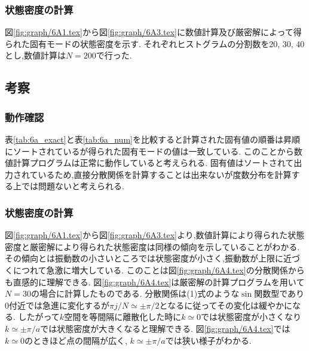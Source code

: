 \subsubsection{状態密度の計算}
図\ref{fig:graph/6A1.tex}から図\ref{fig:graph/6A3.tex}に数値計算及び厳密解によって得られた固有モードの状態密度を示す.
それぞれヒストグラムの分割数を20, 30, 40とし,数値計算は$N=200$で行った.
\subsection{考察}
\subsubsection{動作確認}
表\ref{tab:6a_exact}と表\ref{tab:6a_num}を比較すると計算された固有値の順番は昇順にソートされているが得られた固有モードの値は一致している.
このことから数値計算プログラムは正常に動作していると考えられる.
固有値はソートされて出力されているため,直接分散関係を計算することは出来ないが度数分布を計算する上では問題ないと考えられる.
\subsubsection{状態密度の計算}
図\ref{fig:graph/6A1.tex}から図\ref{fig:graph/6A3.tex}より,数値計算により得られた状態密度と厳密解により得られた状態密度は同様の傾向を示していることがわかる.
その傾向とは振動数の小さいところでは状態密度が小さく,振動数が上限に近づくにつれて急激に増大している.
このことは図\ref{fig:graph/6A4.tex}の分散関係からも直感的に理解できる.
図\ref{fig:graph/6A4.tex}は厳密解の計算プログラムを用いて$N=30$の場合に計算したものである.
分散関係は(1)式のような$\sin$関数型であり$0$付近では急進に変化するが$\pi j/N\simeq\pm\pi/2$となるに従ってその変化は緩やかになる.
したがって$k$空間を等間隔に離散化した時に$k\simeq0$では状態密度が小さくなり$k\simeq\pm\pi/a$では状態密度が大きくなると理解できる.
図\ref{fig:graph/6A4.tex}では$k\simeq0$のときほど点の間隔が広く,
$k\simeq\pm\pi/a$では狭い様子がわかる.
